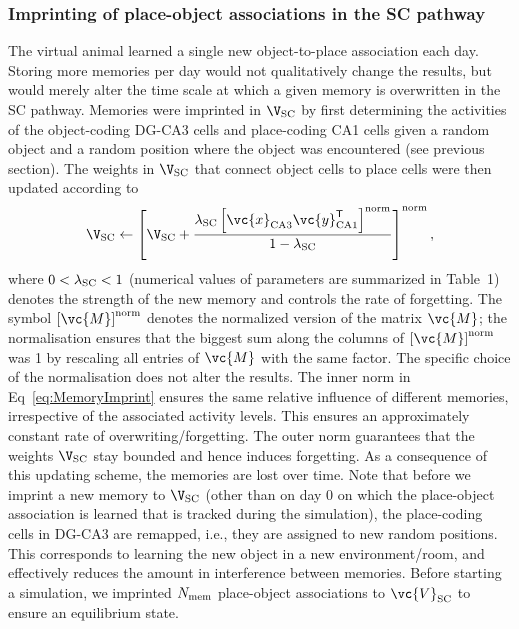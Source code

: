 \subsubsection{Imprinting of place-object associations in the SC pathway}
The virtual animal learned a single new object-to-place association each day. Storing more memories per day would not qualitatively change the results, but would merely alter the time scale at which a given memory is overwritten in the SC pathway. Memories were imprinted in $\V_{\rm SC}$ by first determining the activities of the object-coding DG-CA3 cells and place-coding CA1 cells given a random object and a random position where the object was encountered (see previous section). The weights in $\V_{\rm SC}$ that connect object cells to place cells were then updated according to
\begin{equation}
\V_{\rm SC} \leftarrow \left[ \V_{\rm SC} + \frac{\lambda_{\rm SC} \left[ \vc{x}_{\rm CA3} \vc{y}^{\mathsf T}_{\rm CA1} \right]^{\rm norm} }{1-\lambda_{\rm SC}}  \right ]^{\rm norm},
\label{eq:MemoryImprint}
\end{equation}
where $0<\lambda_{\rm SC}<1$ (numerical values of parameters are summarized in Table~1) denotes the strength of the new memory and controls the rate of forgetting. The symbol $\left[\vc{M}\right]^{\rm norm}$ denotes the normalized version of the matrix $\vc{M}$; the normalisation ensures that the biggest sum along the columns of $\left[\vc{M}\right]^{\rm norm}$ was 1 by rescaling all entries of $\vc{M}$ with the same factor. The specific choice of the normalisation does not alter the results. The inner norm in Eq~\eqref{eq:MemoryImprint} ensures the same relative influence of different memories, irrespective of the associated activity levels. This ensures an approximately constant rate of overwriting/forgetting. The outer norm guarantees that the weights $\V_{\rm SC}$ stay bounded and hence induces forgetting. As a consequence of this updating scheme, the memories are lost over time. Note that before we imprint a new memory to $\V_{\rm SC}$ (other than on day 0 on which the place-object association is learned that is tracked during the simulation), the place-coding cells in DG-CA3 are remapped, i.e., they are assigned to new random positions. This corresponds to learning the new object in a new environment/room, and effectively reduces the amount in interference between memories. Before starting a simulation, we imprinted $N_{\rm mem}$ place-object associations to $\vc{V}_{\rm SC}$ to ensure an equilibrium state.


